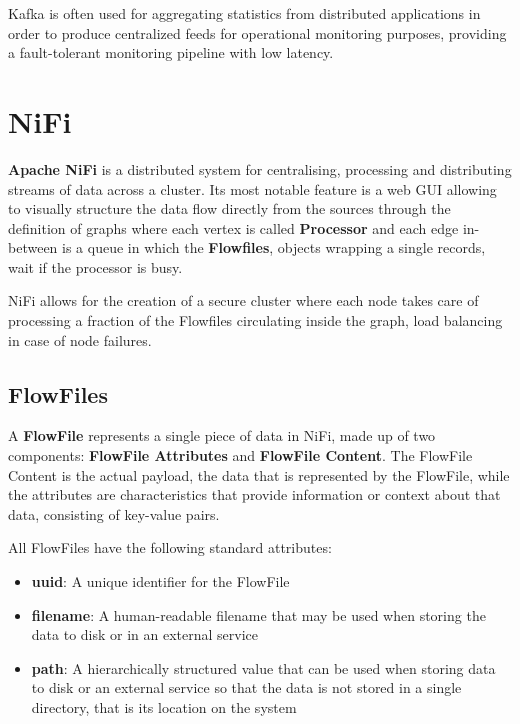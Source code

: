 Kafka is often used for aggregating statistics from distributed applications in order to produce centralized feeds for operational monitoring purposes, providing a fault-tolerant monitoring pipeline with low latency.


\section{NiFi}

\textbf{Apache NiFi} \cite{nifi_doc} is a distributed system for centralising, processing and distributing streams of data across a cluster. Its most notable feature is a web GUI allowing to visually structure the data flow directly from the sources through the definition of graphs where each vertex is called \textbf{Processor} and each edge in-between is a queue in which the \textbf{Flowfiles}, objects wrapping a single records, wait if the processor is busy.

NiFi allows for the creation of a secure cluster where each node takes care of processing a fraction of the Flowfiles circulating inside the graph, load balancing in case of node failures. 

\subsection{FlowFiles}

A \textbf{FlowFile} represents a single piece of data in NiFi, made up of two components: \textbf{FlowFile Attributes} and \textbf{FlowFile Content}. The FlowFile Content is the actual payload, the data that is represented by the FlowFile, while the attributes are characteristics that provide information or context about that data, consisting of key-value pairs. 

All FlowFiles have the following standard attributes:

\begin{itemize}
    \item \textbf{uuid}: A unique identifier for the FlowFile
    
    \item \textbf{filename}: A human-readable filename that may be used when storing the data to disk or in an external service
    
    \item \textbf{path}: A hierarchically structured value that can be used when storing data to disk or an external service so that the data is not stored in a single directory, that is its location on the system
\end{itemize}

